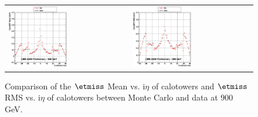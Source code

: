 \begin{figure}[h!]
 \centering
 \begin{tabular}{ll}
  \includegraphics[width=0.5\textwidth]{plots_DataVsMC_MB_900GeV/g_calometPtMean_vs_ieta_900.eps} &
  \includegraphics[width=0.5\textwidth]{plots_DataVsMC_MB_900GeV/g_calometPtRMS_vs_ieta_900.eps} \\
 \end{tabular}
 \caption{\small Comparison of the $\etmiss$ Mean vs. i$\eta$ of calotowers and $\etmiss$ RMS vs. i$\eta$ of calotowers between 
          Monte Carlo and data at $900$ GeV.\label{fig:MET_MeanRMS_vs_ieta_900}}
\end{figure}

